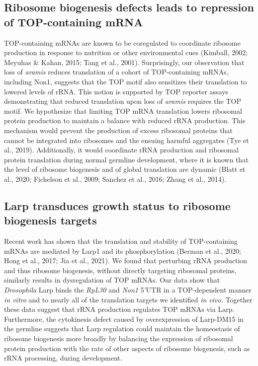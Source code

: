 \documentclass[12pt,oneside]{reedthesis}
\begin{document}
\hypertarget{ribosome-biogenesis-defects-leads-to-repression-of-top-containing-mrna}{%
\subsection{Ribosome biogenesis defects leads to repression of TOP-containing mRNA}\label{ribosome-biogenesis-defects-leads-to-repression-of-top-containing-mrna}}

TOP-containing mRNAs are known to be coregulated to coordinate ribosome
production in response to nutrition or other environmental cues
(Kimball, 2002; Meyuhas \& Kahan, 2015; Tang et al., 2001). Surprisingly, our observation
that loss of \emph{aramis} reduces translation of a cohort of TOP-containing
mRNAs, including Non1, suggests that the TOP motif also sensitizes their
translation to lowered levels of rRNA. This notion is supported by TOP
reporter assays demonstrating that reduced translation upon loss of
\emph{aramis} requires the TOP motif. We hypothesize that limiting TOP mRNA
translation lowers ribosomal protein production to maintain a balance
with reduced rRNA production. This mechanism would prevent the
production of excess ribosomal proteins that cannot be integrated into
ribosomes and the ensuing harmful aggregates
(Tye et al., 2019). Additionally, it would
coordinate rRNA production and ribosomal protein translation during
normal germline development, where it is known that the level of
ribosome biogenesis and of global translation are dynamic
(Blatt et al., 2020; Fichelson et al., 2009; Sanchez et al., 2016; Zhang et al., 2014).

\hypertarget{larp-transduces-growth-status-to-ribosome-biogenesis-targets}{%
\subsection{Larp transduces growth status to ribosome biogenesis targets}\label{larp-transduces-growth-status-to-ribosome-biogenesis-targets}}

Recent work has shown that the translation and stability of
TOP-containing mRNAs are mediated by Larp1 and its phosphorylation
(Berman et al., 2020; Hong et al., 2017; Jia et al., 2021). We found that perturbing rRNA production
and thus ribosome biogenesis, without directly targeting ribosomal
proteins, similarly results in dysregulation of TOP mRNAs. Our data show
that \emph{Drosophila} Larp binds the \emph{RpL30} and \emph{Non1} 5'UTR in a
TOP-dependent manner \emph{in vitro} and to nearly all of the translation
targets we identified \emph{in vivo.} Together these data suggest that rRNA
production regulates TOP mRNAs via Larp. Furthermore, the cytokinesis
defect caused by overexpression of Larp-DM15 in the germline suggests
that Larp regulation could maintain the homeostasis of ribosome
biogenesis more broadly by balancing the expression of ribosomal protein
production with the rate of other aspects of ribosome biogenesis, such
as rRNA processing, during development.
\end{document}
